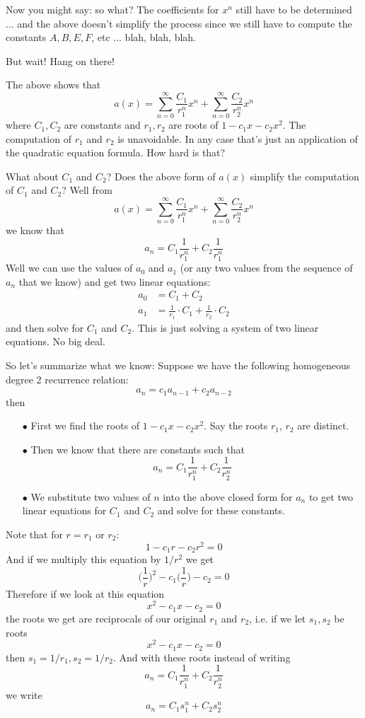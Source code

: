 Now you might say: so what? The coefficients for $x^n$
still have to be determined ...
and the above doesn't simplify the process since we still have to 
compute the constants $A, B, E, F$, etc ... blah, blah, blah.

But wait! Hang on there!

The above shows that
\[
a(x) = 
\sum_{n=0}^\infty \frac{C_1}{r_1^n} x^n + 
\sum_{n=0}^\infty \frac{C_2}{r_2^n} x^n
\]
where $C_1, C_2$ are constants and $r_1, r_2$
are roots of $1 - c_1 x - c_2 x^2$. 
The computation of $r_1$ and $r_2$ is unavoidable.
In any case that's just an application of the quadratic equation formula.
How hard is that?

What about $C_1$ and $C_2$? 
Does the above form of $a(x)$ simplify the computation of $C_1$ 
and $C_2$? 
Well from
\[
a(x) = 
\sum_{n=0}^\infty \frac{C_1}{r_1^n} x^n + 
\sum_{n=0}^\infty \frac{C_2}{r_2^n} x^n
\]
we know that
\[
a_n = C_1 \frac{1}{r_1^n} + C_2 \frac{1}{r_1^n}
\]
Well we can use the values of $a_0$ and $a_1$ (or any two values
from the sequence of $a_n$ that we know) and get two linear
equations:
\begin{align*}
a_0 &= C_1  + C_2 \\
a_1 &= \frac{1}{r_1} \cdot C_1 + \frac{1}{r_2} \cdot C_2
\end{align*}
and then solve for $C_1$ and $C_2$.
This is just solving a system of two linear equations.
No big deal.

So let's summarize what we know:
Suppose we have the following homogeneous degree 2 recurrence relation:
\[
a_n = c_1 a_{n-1} + c_2 a_{n-2}
\]
then 
\begin{enumerate}
\item[$\bullet$] First we find the roots of $1 - c_1x - c_2x^2$. 
Say the roots $r_1$, $r_2$ are distinct.
\item[$\bullet$] Then we know that there are constants such that
\[
a_n = C_1 \frac{1}{r_1^n} + C_2 \frac{1}{r^n_2}
\]
\item[$\bullet$] We substitute two values of $n$ into the above closed
form for $a_n$ to get two linear equations for $C_1$ and $C_2$ and
solve for these constants.
\end{enumerate}

Note that for $r = r_1$ or $r_2$:
\[
1 - c_1 r - c_2 r^2 = 0
\]
And if we multiply this equation by $1/r^2$ we get
\[
\biggl( \frac{1}{r} \biggr)^2 - c_1 \biggl( \frac{1}{r}\biggr) - c_2 = 0
\]
Therefore if we look at this equation
\[
x^2 - c_1x - c_2 = 0
\]
the roots we get are reciprocals of our original $r_1$ and $r_2$, i.e.
if we let $s_1, s_2$ be roots 
\[
x^2 - c_1x - c_2 = 0
\] 
then $s_1 = 1/r_1, s_2 = 1/r_2$.
And with these roots instead of writing
\[
a_n = C_1 \frac{1}{r_1^n} + C_2 \frac{1}{r^n_2}
\]
we write
\[
a_n = C_1 {s_1^n} + C_2 {s^n_2}
\]

